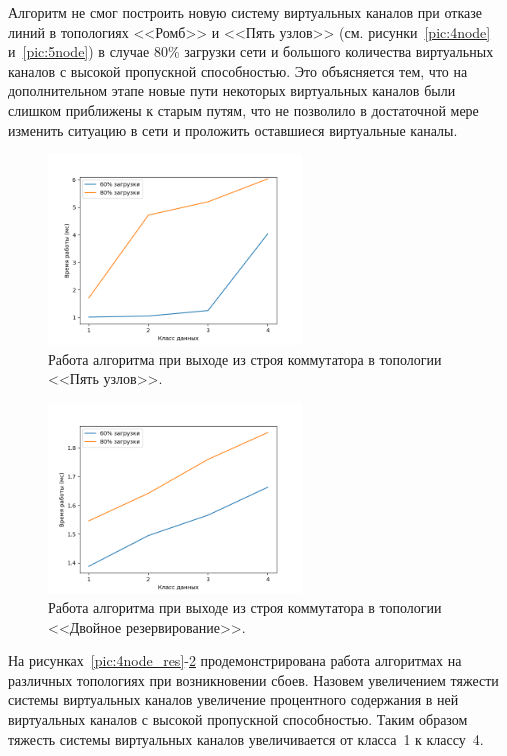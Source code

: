 \documentclass[12pt, a4paper]{article}
\begin{document}
Алгоритм не смог построить новую систему виртуальных каналов при отказе линий в топологиях <<Ромб>> и <<Пять узлов>> (см. рисунки~\ref{pic:4node} и~\ref{pic:5node}) в случае 80\% загрузки сети и большого количества виртуальных каналов с высокой пропускной способностью. Это объясняется тем, что на дополнительном этапе новые пути некоторых виртуальных каналов были слишком приближены к старым путям, что не позволило в достаточной мере изменить ситуацию в сети и проложить оставшиеся виртуальные каналы.

\begin{figure}[h!]
	\centering
	\includegraphics[width=0.60\textwidth]{img/5node_res_sw.png}
	\caption{Работа алгоритма при выходе из строя коммутатора в топологии <<Пять узлов>>.}
	\label{pic:5node_res_sw}
\end{figure}

\begin{figure}[h!]
	\centering
	\includegraphics[width=0.60\textwidth]{img/double_res.png}
	\caption{Работа алгоритма при выходе из строя коммутатора в топологии <<Двойное резервирование>>.}
	\label{pic:double_res}
\end{figure}


На рисунках~\ref{pic:4node_res}-\ref{pic:double_res} продемонстрирована работа алгоритмах на различных топологиях при возникновении сбоев. Назовем увеличением тяжести системы виртуальных каналов увеличение процентного содержания в ней виртуальных каналов с высокой пропускной способностью. Таким образом тяжесть системы виртуальных каналов увеличивается от класса~1 к классу~4. 
\end{document}
